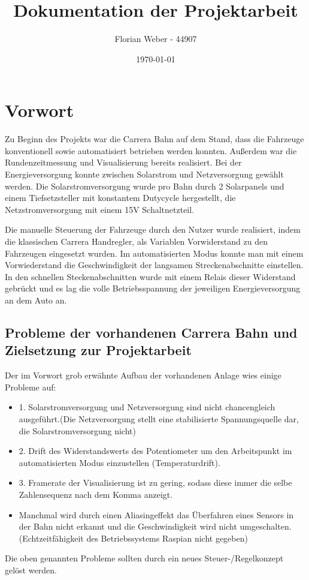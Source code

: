 \documentclass[a4paper, 11pt]{report}
\title{Dokumentation der Projektarbeit}
\author{Florian Weber - 44907}
\date{\today}
\begin{document}
\maketitle	%
\newpage

\tableofcontents 	%
\listoffigures		%
\newpage

\chapter{Vorwort}
Zu Beginn des Projekts war die Carrera Bahn auf dem Stand, dass die Fahrzeuge konventionell sowie automatisiert betrieben werden konnten. Außerdem war die Rundenzeitmessung und Visualisierung bereits realisiert. Bei der Energieversorgung konnte zwischen Solarstrom und Netzversorgung gewählt werden.
Die Solarstromversorgung wurde pro Bahn durch 2 Solarpanels und einem Tiefsetzsteller mit konstantem Dutycycle hergestellt, die Netzstromversorgung mit einem 15V Schaltnetzteil.

Die manuelle Steuerung der Fahrzeuge durch den Nutzer wurde realisiert, indem die klassischen Carrera Handregler, als Variablen Vorwiderstand zu den Fahrzeugen eingesetzt wurden. Im automatisierten Modus konnte man mit einem Vorwiederstand die Geschwindigkeit der langsamen Streckenabschnitte einstellen. In den schnellen Steckenabschnitten wurde mit einem Relais dieser Widerstand gebrückt und es lag die volle Betriebsspannung der jeweiligen Energieversorgung an dem Auto an.
\section{Probleme der vorhandenen Carrera Bahn und Zielsetzung zur Projektarbeit}
Der im Vorwort grob erwähnte Aufbau der vorhandenen Anlage wies einige Probleme auf:
\begin{itemize}
	\item 1. Solarstromversorgung und Netzversorgung sind nicht chancengleich ausgeführt.(Die Netzversorgung stellt eine stabilisierte Spannungsquelle dar, die Solarstromversorgung nicht)
	\item 2. Drift des Widerstandswerts des Potentiometer um den Arbeitspunkt im automatisierten Modus einzustellen (Temperaturdrift).
	\item 3. Framerate der Visualisierung ist zu gering, sodass diese immer die selbe Zahlensequenz nach dem Komma anzeigt.
	\item Manchmal wird durch einen Aliasingeffekt das Überfahren eines Sensors in der Bahn nicht erkannt und die Geschwindigkeit wird nicht umgeschalten. (Echtzeitfähigkeit des Betriebssystems Raspian nicht gegeben)
\end{itemize}
Die oben genannten Probleme sollten durch ein neues Steuer-/Regelkonzept gelöst werden.
\newpage
\end{document}
